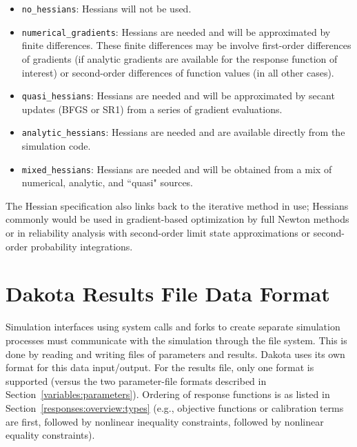 \begin{itemize}

\item \texttt{no\_hessians}: Hessians will not be used.

\item \texttt{numerical\_gradients}: Hessians are needed and will be
  approximated by finite differences.  These finite differences may be
  involve first-order differences of gradients (if analytic gradients
  are available for the response function of interest) or second-order 
  differences of function values (in all other cases).

\item \texttt{quasi\_hessians}: Hessians are needed and will be 
  approximated by secant updates (BFGS or SR1) from a series of 
  gradient evaluations.

\item \texttt{analytic\_hessians}: Hessians are needed and are
  available directly from the simulation code.

\item \texttt{mixed\_hessians}: Hessians are needed and will be 
  obtained from a mix of numerical, analytic, and ``quasi" sources.

\end{itemize}

The Hessian specification also links back to the iterative method in
use; Hessians commonly would be used in gradient-based
optimization by full Newton methods or in reliability analysis
with second-order limit state approximations or second-order
probability integrations.

\section{Dakota Results File Data Format}\label{responses:results}

Simulation interfaces using system calls and forks to create
separate simulation processes must communicate with the simulation
through the file system. This is done by reading and
writing files of parameters and results. Dakota uses its own format
for this data input/output. For the results file, only one format is
supported (versus the two parameter-file formats described in
Section~\ref{variables:parameters}). Ordering of response functions is
as listed in Section~\ref{responses:overview:types} (e.g., objective
functions or calibration terms are first, followed by nonlinear
inequality constraints, followed by nonlinear equality constraints).

